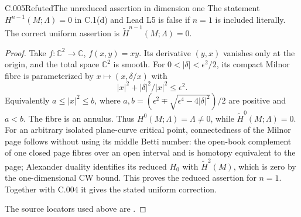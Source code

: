 \begin{saresult}{C.005}{Refuted}{The unreduced assertion in dimension one}
The statement $H^{n-1}(M;\Lambda)=0$ in C.1(d) and Lead L5 is false if
$n=1$ is included literally. The correct uniform assertion is
$\widetilde H^{n-1}(M;\Lambda)=0$.
\end{saresult}
\begin{proof}
Take $f:\mathbb C^2\to\mathbb C$, $f(x,y)=xy$.
Its derivative $(y,x)$ vanishes only at the origin, and the total space
$\mathbb C^2$ is smooth. For $0<|\delta|<\epsilon^2/2$, its compact Milnor fibre
is parameterized by $x\mapsto(x,\delta/x)$ with
\[
 |x|^2+|\delta|^2/|x|^2\leq\epsilon^2.
\]
Equivalently $a\leq |x|^2\leq b$, where
$a,b=(\epsilon^2\mp\sqrt{\epsilon^4-4|\delta|^2})/2$ are positive and $a<b$.
The fibre is an annulus. Thus $H^0(M;\Lambda)=\Lambda\ne0$, while
$\widetilde H^0(M;\Lambda)=0$.
For an arbitrary isolated plane-curve critical point, connectedness of
the Milnor page follows without using its middle Betti number:
the open-book complement of one closed page fibres over an open interval
and is homotopy equivalent to the page; Alexander duality identifies
its reduced $H_0$ with $\widetilde H^{2}(M)$, which is zero by the
one-dimensional CW bound. This proves the reduced assertion for $n=1$.
Together with C.004 it gives the stated uniform correction.

The source locators used above are \cite[Corollaries~6.2--6.3, pp.~56--57]{C-milnor1968}.
\end{proof}

